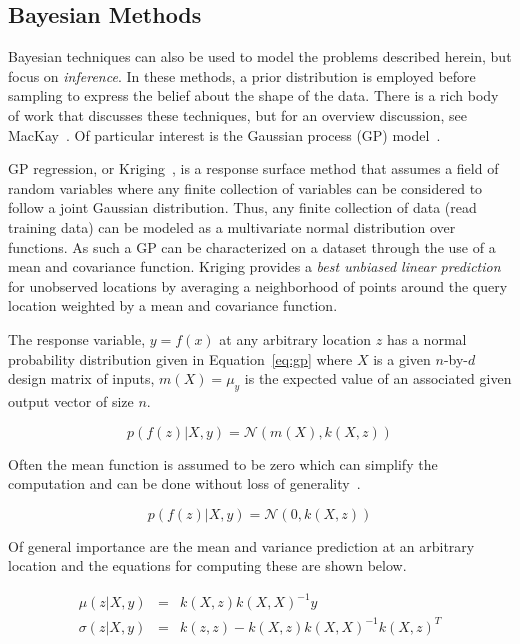 
\subsection{Bayesian Methods}

Bayesian techniques can also be used to model the problems described herein, but focus on \emph{inference}.
%
In these methods, a prior distribution is employed before sampling to express the belief about the shape of the data.
%
There is a rich body of work that discusses these techniques, but for an overview discussion, see MacKay~\cite{MacKay1992b}.
%
Of particular interest is the Gaussian process (GP) model~\cite{RasmussenWilliams2006}.

GP regression, or Kriging~\cite{Stein1999}, is a response surface method that assumes a field of random variables where any finite collection of variables can be considered to follow a joint Gaussian distribution.
%
Thus, any finite collection of data (read training data) can be modeled as a multivariate normal distribution over functions.
%
As such a GP can be characterized on a dataset through the use of a mean and covariance function.
%
Kriging provides a \emph{best unbiased linear prediction} for unobserved locations by averaging a neighborhood of points around the query location weighted by a mean and covariance function.

The response variable, $y=f(x)$ at any arbitrary location $z$ has a normal probability distribution given in Equation~\ref{eq:gp} where $X$ is a given $n$-by-$d$ design matrix of inputs, $m(X) = \mu_y$ is the expected value of an associated given output vector of size $n$.

\begin{equation}
p(f(z)|X,y) = \mathcal{N}(m(X),k(X,z))
\label{eq:gp}
\end{equation}

Often the mean function is assumed to be zero which can simplify the computation and can be done without loss of generality~\cite{Seeger2004}.

\begin{equation}
p(f(z)|X,y) = \mathcal{N}(0,k(X,z))
\label{eq:gpSimple}
\end{equation}

Of general importance are the mean and variance prediction at an arbitrary location and the equations for computing these are shown below.

\begin{eqnarray}
\mu(z|X,y) & = & k(X,z)k(X,X)^{-1}y\\
\sigma(z|X,y) & = & k(z,z) - k(X,z)k(X,X)^{-1}k(X,z)^T
\end{eqnarray}

